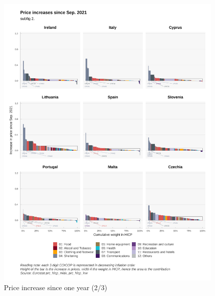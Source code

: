 \documentclass[
  9pt,
  a4paper,
  numbers=noendperiod,
  DIV=12]{scrartcl}
\begin{document}
\begin{figure}

\caption{Price increase since one year (2/3)}

{\centering \includegraphics{svg/depuis_1y_2.png}

}

\end{figure}
\end{document}
